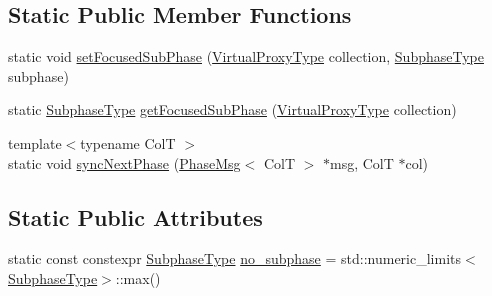 \subsection*{Static Public Member Functions}
\begin{DoxyCompactItemize}
\item 
static void \hyperlink{structvt_1_1vrt_1_1collection_1_1balance_1_1_element_stats_a783aba29f79b50652c78ca148b766578}{set\+Focused\+Sub\+Phase} (\hyperlink{namespacevt_a1b417dd5d684f045bb58a0ede70045ac}{Virtual\+Proxy\+Type} collection, \hyperlink{structvt_1_1vrt_1_1collection_1_1balance_1_1_element_stats_af9ec1f2527b6569a003579f7950db71e}{Subphase\+Type} subphase)
\item 
static \hyperlink{structvt_1_1vrt_1_1collection_1_1balance_1_1_element_stats_af9ec1f2527b6569a003579f7950db71e}{Subphase\+Type} \hyperlink{structvt_1_1vrt_1_1collection_1_1balance_1_1_element_stats_a15c03cb8f5873d0c8fea615767254856}{get\+Focused\+Sub\+Phase} (\hyperlink{namespacevt_a1b417dd5d684f045bb58a0ede70045ac}{Virtual\+Proxy\+Type} collection)
\item 
{\footnotesize template$<$typename ColT $>$ }\\static void \hyperlink{structvt_1_1vrt_1_1collection_1_1balance_1_1_element_stats_a8238b75b708497ec5969235c52b2d338}{sync\+Next\+Phase} (\hyperlink{namespacevt_1_1vrt_1_1collection_1_1balance_a7120dc064f6e8c4157a5f4c81b825393}{Phase\+Msg}$<$ ColT $>$ $\ast$msg, ColT $\ast$col)
\end{DoxyCompactItemize}
\subsection*{Static Public Attributes}
\begin{DoxyCompactItemize}
\item 
static const constexpr \hyperlink{structvt_1_1vrt_1_1collection_1_1balance_1_1_element_stats_af9ec1f2527b6569a003579f7950db71e}{Subphase\+Type} \hyperlink{structvt_1_1vrt_1_1collection_1_1balance_1_1_element_stats_a26682687c88b2c607365b040a9804096}{no\+\_\+subphase} = std\+::numeric\+\_\+limits$<$\hyperlink{structvt_1_1vrt_1_1collection_1_1balance_1_1_element_stats_af9ec1f2527b6569a003579f7950db71e}{Subphase\+Type}$>$\+::max()
\end{DoxyCompactItemize}

